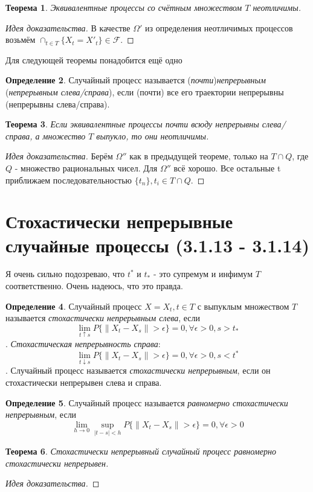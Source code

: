 \documentclass[16pt]{article}
\newtheorem{theorem}{Теорема}[section]
\theoremstyle{definition}
\newtheorem{definition}[theorem]{Определение}
\begin{document}
\begin{theorem}
Эквивалентные процессы со счётным множеством $T$ неотличимы.
\end{theorem}
\begin{proof}[Идея доказательства]
В качестве $\Omega'$ из определения неотличимых процессов возьмём $\cap_{t \in T}\{X_t = X'_t\} \in \mathcal{F}$.
\end{proof}
Для следующей теоремы понадобится ещё одно
\begin{definition}
Случайный процесс называется (\textit{почти})\textit{непрерывным} (\textit{непрерывным слева/справа}), если (почти) все его траектории непрерывны (непрерывны слева/справа).
\end{definition}
\begin{theorem}
Если эквивалентные процессы почти всюду непрерывны слева/справа, а множество $T$ выпукло, то они неотличимы.
\end{theorem}
\begin{proof}[Идея доказательства]
Берём $\Omega''$ как в предыдущей теореме, только на $T \cap Q$, где $Q$ - множество рациональных чисел. Для $\Omega''$ всё хорошо. Все остальные t приближаем последовательностью $\{t_n\}, t_i \in T \cap Q$. 
\end{proof}

\section{Стохастически непрерывные случайные процессы (3.1.13 - 3.1.14)}
Я очень сильно подозреваю, что $t^*$ и $t_*$ - это супремум и инфимум $T$ соответственно. Очень надеюсь, что это правда.
\begin{definition}
Случайный процесс $X = {X_t, t \in T}$ с выпуклым множеством $T$ называется \textit{стохастически непрерывным слева}, если $$\lim_{t \uparrow s}P\{\|X_t - X_s\| > \epsilon\} = 0, \forall \epsilon > 0, s > t_*$$.
\textit{Стохастическая непрерывность справа}: $$\lim_{t \downarrow s}P\{\|X_t - X_s\| > \epsilon\} = 0, \forall \epsilon > 0, s < t^*$$.
Случайный процесс называется \textit{стохастически непрерывным}, если он стохастически непрерывен слева и справа.
\end{definition}
\begin{definition}
Случайный процесс называется \textit{равномерно стохастически непрерывным}, если $$\lim_{h \rightarrow 0}\sup_{|t - s| < h}P\{\|X_t - X_s\| > \epsilon\} = 0, \forall \epsilon > 0$$
\end{definition}
\begin{theorem}
Стохастически непрерывный случайный процесс равномерно стохастически непрерывен.
\end{theorem}
\begin{proof}[Идея доказательства]

\end{proof}
\end{document}

